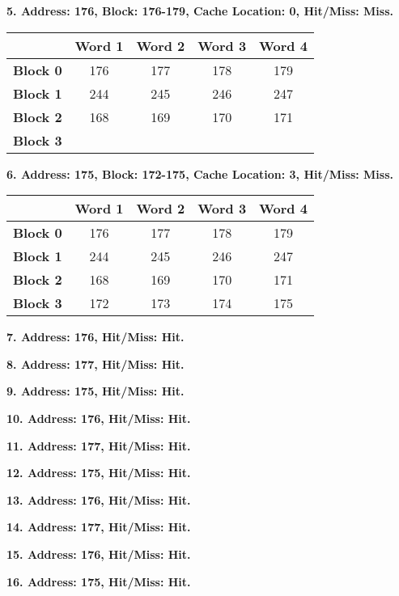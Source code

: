 \documentclass[a4paper, 11pt]{exam}
\begin{document}
\begin{enumerate}
\textbf{5. Address: 176, Block: 176-179, Cache Location: 0, Hit/Miss: Miss.}

\begin{center}
	\begin{tabular}{ |c|c|c|c|c| } 
		\hline
		&\textbf{Word 1}& \textbf{Word 2}& \textbf{Word 3} & \textbf{Word 4}\\ 
		\hline
		\textbf{Block 0} &  176 &  177 & 178 & 179\\ 
		\hline
		\textbf{Block 1} &  244 & 245 & 246 & 247\\ 
		\hline
		\textbf{Block 2} & 168 & 169  & 170 & 171\\ 
		\hline
		\textbf{Block 3} &  &   &  &\\ 
		\hline
	\end{tabular}
\end{center}

\textbf{6. Address: 175, Block: 172-175, Cache Location: 3, Hit/Miss: Miss.}

\begin{center}
	\begin{tabular}{ |c|c|c|c|c| } 
		\hline
		&\textbf{Word 1}& \textbf{Word 2}& \textbf{Word 3} & \textbf{Word 4}\\ 
		\hline
		\textbf{Block 0} &  176 &  177 & 178 & 179\\ 
		\hline
		\textbf{Block 1} &  244 & 245 & 246 & 247\\ 
		\hline
		\textbf{Block 2} & 168 & 169  & 170 & 171\\ 
		\hline
		\textbf{Block 3} & 172 & 173 & 174 & 175\\ 
		\hline
	\end{tabular}
\end{center}

\textbf{7. Address: 176, Hit/Miss: Hit.}

\textbf{8. Address: 177, Hit/Miss: Hit.}

\textbf{9. Address: 175, Hit/Miss: Hit.}

\textbf{10. Address: 176, Hit/Miss: Hit.}

\textbf{11. Address: 177, Hit/Miss: Hit.}

\textbf{12. Address: 175, Hit/Miss: Hit.}

\textbf{13. Address: 176, Hit/Miss: Hit.}

\textbf{14. Address: 177, Hit/Miss: Hit.}

\textbf{15. Address: 176, Hit/Miss: Hit.}

\textbf{16. Address: 175, Hit/Miss: Hit.}


\end{enumerate}
\end{document}
